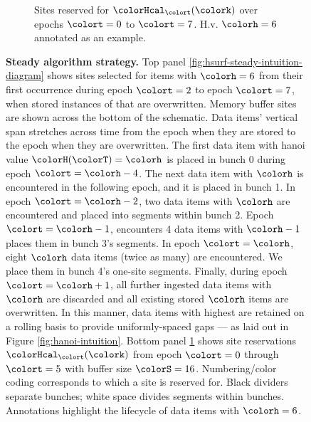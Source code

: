 \begin{figure}[htbp!]
\begin{subfigure}[b]{0.98\linewidth}
\begin{tikzpicture}
    \end{tikzpicture}
    \vspace{-5ex}
    \caption{\footnotesize Sites reserved for \hv{} $\colorHcal_{\colort}(\colork)$ over epochs $\colort=0$ to $\colort=7$. H.v.{} $\colorh=6$ annotated as an example.}
    \label{fig:hsurf-steady-intuition-heatmap}
  \end{subfigure}%
  \vspace{-2ex}
  \caption{
    \textbf{Steady algorithm strategy.}
    \footnotesize
    Top panel \ref{fig:hsurf-steady-intuition-diagram} shows sites selected for items with \hv{} $\colorh=6$ from their first occurrence during epoch $\colort=2$ to epoch $\colort=7$, when stored instances of that \hv{} are overwritten.
    Memory buffer sites are shown across the bottom of the schematic.
    Data items' vertical span stretches across time from the epoch when they are stored to the epoch when they are overwritten.
    The first data item with hanoi value $\colorH(\colorT) = \colorh$ is placed in bunch 0 during epoch $\colort=\colorh-4$.
    The next data item with \hv{} $\colorh$ is encountered in the following epoch, and it is placed in bunch 1.
    In epoch $\colort=\colorh-2$, two data items with \hv{} $\colorh$ are encountered and placed into segments within bunch 2.
    Epoch $\colort=\colorh-1$, encounters 4 data items with \hv{} $\colorh-1$ places them in bunch 3's segments.
    In epoch $\colort=\colorh$, eight \hv{} $\colorh$ data items (twice as many) are encountered.
    We place them in bunch 4's one-site segments.
    Finally, during epoch $\colort=\colorh+1$, all further ingested data items with \hv{} $\colorh$ are discarded and all existing stored \hv{} $\colorh$ items are overwritten.
    In this manner, data items with highest \hv{} are retained on a rolling basis to provide uniformly-spaced gaps --- as laid out in Figure \ref{fig:hanoi-intuition}.
    Bottom panel \ref{fig:hsurf-steady-intuition-heatmap} shows \hv{} site reservations $\colorHcal_{\colort}(\colork)$ from epoch $\colort=0$ through $\colort=5$ with buffer size $\colorS=16$.
    Numbering/color coding corresponds to which \hv{} a site is reserved for.
    Black dividers separate bunches; white space divides segments within bunches.
    Annotations highlight the lifecycle of data items with \hv{} $\colorh=6$.
  }
  \label{fig:hsurf-steady-intuition}
\end{figure}
